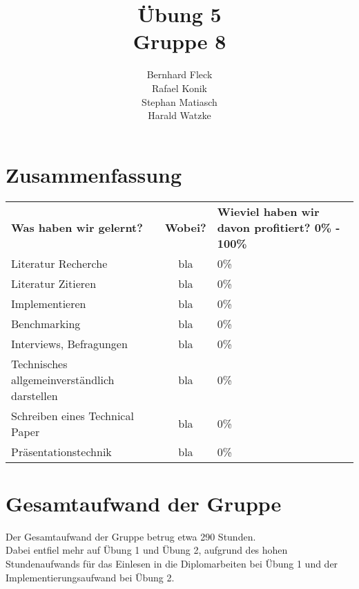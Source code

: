 \documentclass[11pt]{article} %
\title{Übung 5\\Gruppe 8}
\author{Bernhard Fleck\\Rafael Konik\\Stephan Matiasch\\Harald Watzke}
\begin{document}
\maketitle

\section{Zusammenfassung}

\begin{table}[!ht]
   \begin{center}
	\begin{tabular}{ m{5cm}  c  m{5cm} }
	\textbf{Was haben wir gelernt?} & \textbf{Wobei?} & \textbf{Wieviel haben wir davon profitiert? 0\% - 100\%}\\

	\centering Literatur Recherche & bla & 0\%\\\hline

	\centering Literatur Zitieren & bla &0\%\\\hline

	\centering Implementieren & bla & 0\%\\\hline

	\centering Benchmarking & bla & 0\%\\\hline

	\centering Interviews, Befragungen & bla & 0\%\\\hline

	\centering Technisches allgemeinverständlich darstellen & bla & 0\%\\\hline

	\centering Schreiben eines Technical Paper & bla & 0\%\\\hline

	\centering Präsentationstechnik & bla & 0\%\\\hline
	\end{tabular}
   \end{center}
\end{table}

\section{Gesamtaufwand der Gruppe}

Der Gesamtaufwand der Gruppe betrug etwa 290 Stunden.\\ Dabei entfiel mehr auf Übung 1 und Übung 2, aufgrund des hohen Stundenaufwands für das Einlesen in die Diplomarbeiten bei Übung 1 und der Implementierungsaufwand bei Übung 2.
\end{document}
